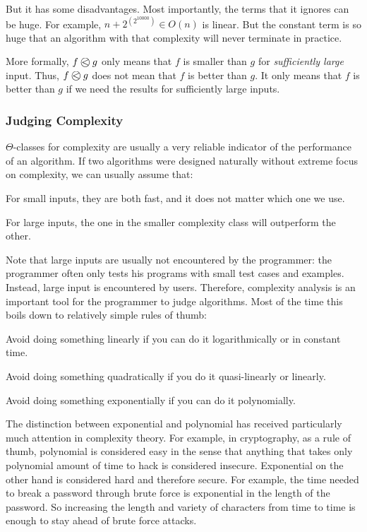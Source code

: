 But it has some disadvantages.
Most importantly, the terms that it ignores can be huge.
For example, $n+2^{(2^10000)}\in O(n)$ is linear.
But the constant term is so huge that an algorithm with that complexity will never terminate in practice.

More formally, $\Oleq{f}{g}$ only means that $f$ is smaller than $g$ for \emph{sufficiently large} input.
Thus, $\Oleq{f}{g}$ does not mean that $f$ is better than $g$.
It only means that $f$ is better than $g$ if we need the results for sufficiently large inputs.

\subsubsection{Judging Complexity}

$\Theta$-classes for complexity are usually a very reliable indicator of the performance of an algorithm.
If two algorithms were designed naturally without extreme focus on complexity, we can usually assume that:
\begin{compactitem}
 \item For small inputs, they are both fast, and it does not matter which one we use.
 \item For large inputs, the one in the smaller complexity class will outperform the other.
\end{compactitem}

Note that large inputs are usually not encountered by the programmer: the programmer often only tests his programs with small test cases and examples.
Instead, large input is encountered by users.
Therefore, complexity analysis is an important tool for the programmer to judge algorithms.
Most of the time this boils down to relatively simple rules of thumb:
\begin{compactitem} 
 \item Avoid doing something linearly if you can do it logarithmically or in constant time.
 \item Avoid doing something quadratically if you do it quasi-linearly or linearly.
 \item Avoid doing something exponentially if you can do it polynomially.
\end{compactitem}

The distinction between exponential and polynomial has received particularly much attention in complexity theory.
For example, in cryptography, as a rule of thumb, polynomial is considered easy in the sense that anything that takes only polynomial amount of time to hack is considered insecure.
Exponential on the other hand is considered hard and therefore secure.
For example, the time needed to break a password through brute force is exponential in the length of the password.
So increasing the length and variety of characters from time to time is enough to stay ahead of brute force attacks.

